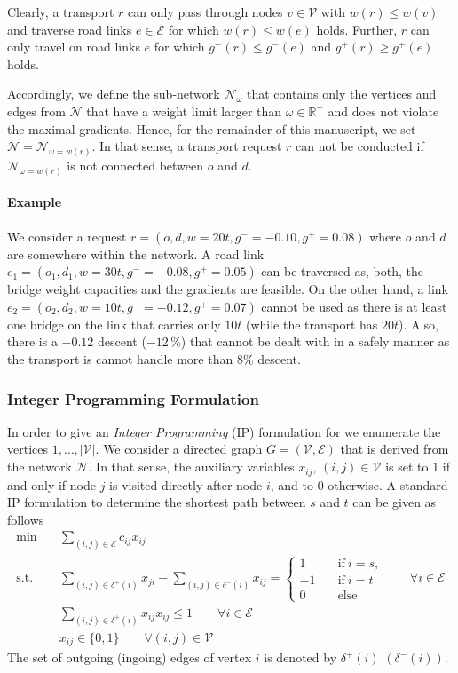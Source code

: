 Clearly, a transport $r$ can only pass through nodes $v \in \mathcal{V}$ with
$w(r) \leq w(v)$ and traverse road links $e \in \mathcal{E}$ for which $w(r) \leq w(e)$ holds.
Further, $r$ can only travel on road links $e$ for which $g^{-}(r)\leq g^-(e)$ and
 $g^{+}(r)\geq g^+(e)$ holds.

Accordingly, we define the sub-network $\mathcal{N}_{\omega}$ that contains only the vertices and edges from $\mathcal{N}$ that have a weight limit larger than $\omega \in \mathbb{R}^{+}$ and
does not violate the maximal gradients.
Hence, for the remainder of this manuscript, we set $\mathcal{N}=\mathcal{N}_{\omega=w(r)}$.
In that sense, a transport request $r$ can not be conducted if $\mathcal{N}_{\omega=w(r)}$ is not
connected between $o$ and $d$.

\paragraph{Example}
We consider a request $r=(o,d,w=20t, g^{-}=-0.10, g^{+}=0.08)$ where $o$ and $d$ are somewhere within the network. A road link $e_1=(o_1,d_1, w=30t, g^{-}=-0.08, g^{+}=0.05)$  can be traversed as, both, the bridge weight capacities and the gradients are feasible. On the other hand,  a link
$e_2=(o_2,d_2, w=10t, g^{-}=-0.12, g^{+}=0.07)$ cannot be used as there is at least one bridge
on the link that carries only $10t$ (while the transport has $20t$). Also, there
is a $-0.12$ descent ($-12\,\%$) that cannot be dealt with in a safely manner as the
transport is cannot handle more than $8\%$ descent.


\subsubsection{Integer Programming Formulation}
In order to give an \emph{Integer Programming} (IP) formulation for we enumerate the
vertices $1,\ldots,|\mathcal{V}|$. We consider a directed graph $G=(\mathcal{V},\mathcal{E})$ that is derived from the network $\mathcal{N}$.
In that sense, the auxiliary variables $x_{ij}$, $(i,j) \in \mathcal{V}$
is set to $1$ if and only if node $j$ is visited directly after node $i$, and to $0$ otherwise.
A standard IP formulation to determine the shortest path between $s$ and $t$ can be given as follows
\begin{align}
  \min \quad &\sum_{(i,j)\in \mathcal{E}}  c_{ij} x_{ij} \label{obj} \\
  \text{s.t.}\quad &
  \sum_{(i,j)\in \delta^{+} (i)} x_{ji} - \sum_{(i,j)\in \delta^{-}(i)} x_{ij} =
  \begin{cases}
    1 \quad& \text{if}~ i=s, \\
    -1 \quad& \text{if}~ i=t \\
    0 \quad&\text{else}
  \end{cases}
  \qquad \forall i \in \mathcal{E}
  \\
  &  \sum_{(i,j)\in \delta^{+} (i)} x_{ij}   x_ {ij} \leq 1     \qquad \forall i \in \mathcal{E}\\
  &  x_{ij} \in \{0,1\}   \qquad \forall (i,j) \in \mathcal{V}
\end{align}
The set of outgoing (ingoing) edges of vertex $i$ is denoted by  $\delta^{+} (i)$  $(\delta^{-} (i))$.


